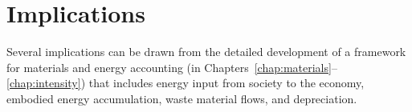 %
%
%

\chapter{Implications}
\label{chap:implications}





Several implications can be drawn from the detailed development 
of a framework for materials and energy accounting 
(in Chapters~\ref{chap:materials}--\ref{chap:intensity})
that includes energy input from society to the economy,
embodied energy accumulation, waste material flows, and depreciation.



